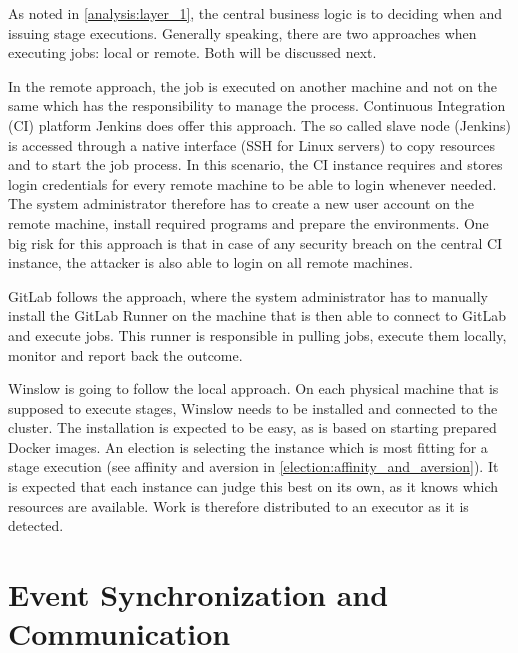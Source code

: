 As noted in \autoref{analysis:layer_1}, the central business logic is to deciding when and issuing stage executions.
Generally speaking, there are two approaches when executing jobs: local or remote. Both will be discussed next.

In the remote approach, the job is executed on another machine and not on the same which has the responsibility to manage the process.
Continuous Integration (CI) platform Jenkins\cite{jenkins:main} does offer this approach.
The so called slave node (Jenkins) is accessed through a native interface (SSH for Linux servers) to copy resources and to start the job process.
In this scenario, the CI instance requires and stores login credentials for every remote machine to be able to login whenever needed.
The system administrator therefore has to create a new user account on the remote machine, install required programs and prepare the environments.
One big risk for this approach is that in case of any security breach on the central CI instance, the attacker is also able to login on all remote machines.

GitLab\cite{gitlab:main} follows the approach, where the system administrator has to manually install the GitLab Runner on the machine that is then able to connect to GitLab and execute jobs.
This runner is responsible in pulling jobs, execute them locally, monitor and report back the outcome.

Winslow is going to follow the local approach.
On each physical machine that is supposed to execute stages, Winslow needs to be installed and connected to the cluster.
The installation is expected to be easy, as is based on starting prepared Docker images.
An election is selecting the instance which is most fitting for a stage execution (see affinity and aversion in \autoref{election:affinity_and_aversion}).
It is expected that each instance can judge this best on its own, as it knows which resources are available.
Work is therefore distributed to an executor as it is detected.



\section{Event Synchronization and Communication}
\label{design:synchronization}

